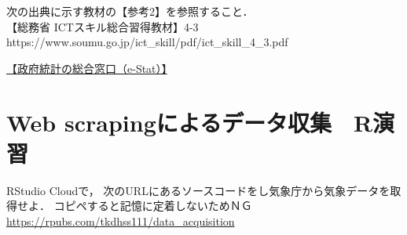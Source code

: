\MyFrame{\insertsection}
{
  次の出典に示す教材の【参考2】を参照すること．\\
  \MyRef
  {【総務省 ICTスキル総合習得教材】4-3}
  {https://www.soumu.go.jp/ict_skill/pdf/ict_skill_4_3.pdf}

  \href{https://www.e-stat.go.jp}{【政府統計の総合窓口（e-Stat）】}　　　
}

\section{Web scrapingによるデータ収集　R演習}

\MyFrame{\insertsection}
{
  RStudio Cloudで，
  次のURLにあるソースコードをし気象庁から気象データを取得せよ．
  \alert{コピペすると記憶に定着しないためＮＧ}
  \url{https://rpubs.com/tkdhss111/data_acquisition}
}


